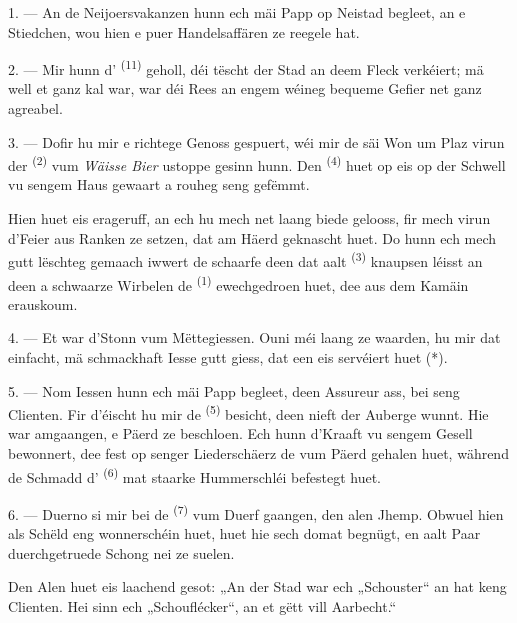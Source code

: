 1. --- An de Neijoersvakanzen hunn ech mäi Papp op Neistad begleet, an e Stiedchen,
wou hien e puer Handelsaffären ze reegele hat.

2. --- Mir hunn d' \textsuperscript{(11)} geholl, déi tëscht der
Stad an deem Fleck verkéiert; mä well et ganz kal war, war déi Rees an engem wéineg
bequeme Gefier net ganz agreabel.

3. --- Dofir hu mir e richtege Genoss gespuert, wéi mir de  säi Won
um Plaz virun der  \textsuperscript{(2)} vum \textit{Wäisse Bier}
ustoppe gesinn hunn. Den  \textsuperscript{(4)} huet op eis op der
Schwell vu sengem Haus gewaart a rouheg seng  gefëmmt.

Hien huet eis erageruff, an ech hu mech net laang biede gelooss, fir mech virun d'Feier
aus Ranken ze setzen, dat am Häerd geknascht huet. Do hunn ech mech gutt lëschteg
gemaach iwwert de schaarfe  deen dat aalt 
\textsuperscript{(3)} knaupsen léisst an deen a schwaarze Wirbelen de
 \textsuperscript{(1)} ewechgedroen huet, dee aus dem Kamäin
erauskoum.

4. --- Et war d'Stonn vum Mëttegiessen. Ouni méi laang ze waarden, hu mir dat
einfacht, mä schmackhaft Iesse gutt giess, dat een eis servéiert huet (*).

\VUsaut{3.0mm}

5. --- Nom Iessen hunn ech mäi Papp begleet, deen Assureur ass, bei seng Clienten.
Fir d'éischt hu mir de  \textsuperscript{(5)} besicht, deen nieft der
Auberge wunnt. Hie war amgaangen, e Päerd ze beschloen. Ech hunn d'Kraaft vu sengem
Gesell bewonnert, dee fest op senger Liederschäerz de  vum Päerd
gehalen huet, während de Schmadd d' \textsuperscript{(6)} mat staarke
Hummerschléi befestegt huet.

6. --- Duerno si mir bei de  \textsuperscript{(7)} vum Duerf
gaangen, den alen Jhemp. Obwuel hien als Schëld eng wonnerschéin  huet,
huet hie sech domat begnügt, en aalt Paar duerchgetruede Schong nei ze suelen.

Den Alen huet eis laachend gesot: „An der Stad war ech „Schouster“ an hat keng
Clienten. Hei sinn ech „Schouflécker“, an et gëtt vill Aarbecht.“

